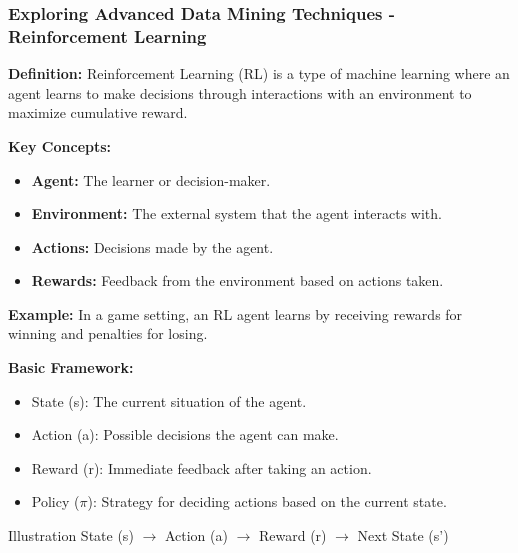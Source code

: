 \documentclass[aspectratio=169]{beamer}
\begin{document}
\begin{frame}[fragile]
    \frametitle{Exploring Advanced Data Mining Techniques - Reinforcement Learning}
    \textbf{Definition:} Reinforcement Learning (RL) is a type of machine learning where an agent learns to make decisions through interactions with an environment to maximize cumulative reward.
    
    \textbf{Key Concepts:}
    \begin{itemize}
        \item \textbf{Agent:} The learner or decision-maker.
        \item \textbf{Environment:} The external system that the agent interacts with.
        \item \textbf{Actions:} Decisions made by the agent.
        \item \textbf{Rewards:} Feedback from the environment based on actions taken.
    \end{itemize}
    
    \textbf{Example:} In a game setting, an RL agent learns by receiving rewards for winning and penalties for losing.
    
    \textbf{Basic Framework:}
    \begin{itemize}
        \item State (s): The current situation of the agent.
        \item Action (a): Possible decisions the agent can make.
        \item Reward (r): Immediate feedback after taking an action.
        \item Policy ($\pi$): Strategy for deciding actions based on the current state.
    \end{itemize}
    
    \begin{block}{Illustration}
        State (s) $\rightarrow$ Action (a) $\rightarrow$ Reward (r) $\rightarrow$ Next State (s')
    \end{block}
\end{frame}
\end{document}
